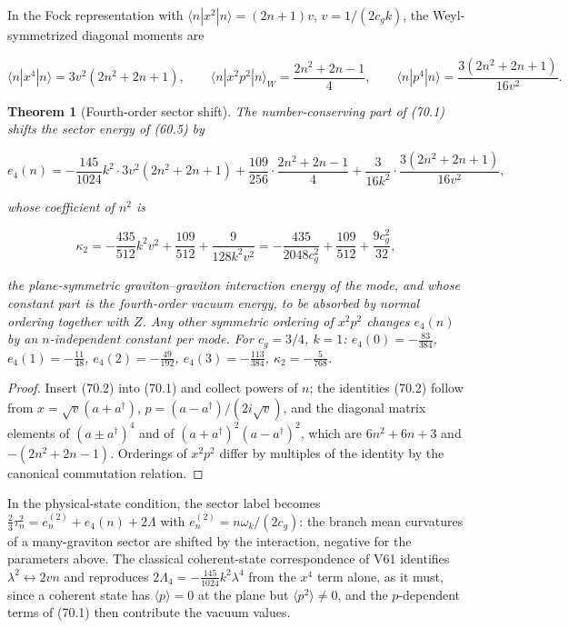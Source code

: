 \documentclass[11pt]{article}
\newtheorem{theorem}{Theorem}[section]
\theoremstyle{remark}
\begin{document}
In the Fock representation with \(\langle n|x^2|n\rangle=(2n+1)v\),
\(v=1/(2c_gk)\), the Weyl-symmetrized diagonal moments are

\[
 \langle n|x^4|n\rangle=3v^2(2n^2+2n+1),\qquad
 \langle n|x^2p^2|n\rangle_W=\frac{2n^2+2n-1}4,\qquad
 \langle n|p^4|n\rangle=\frac{3(2n^2+2n+1)}{16v^2}.                   \tag{70.2}
\]

\begin{theorem}[Fourth-order sector shift]
\label{thm:v19v67-shift}
The number-conserving part of (70.1) shifts the sector energy of
(60.5) by

\[
 e_4(n)=-\frac{145}{1024}k^2\cdot3v^2(2n^2+2n+1)
 +\frac{109}{256}\cdot\frac{2n^2+2n-1}4
 +\frac3{16k^2}\cdot\frac{3(2n^2+2n+1)}{16v^2},                        \tag{70.3}
\]

whose coefficient of \(n^2\) is

\[
 \kappa_2=-\frac{435}{512}k^2v^2+\frac{109}{512}+\frac{9}{128k^2v^2}
 =-\frac{435}{2048c_g^2}+\frac{109}{512}+\frac{9c_g^2}{32},             \tag{70.4}
\]

the plane-symmetric graviton--graviton interaction energy of the mode,
and whose constant part is the fourth-order vacuum energy, to be
absorbed by normal ordering together with \(Z\).  Any other symmetric
ordering of \(x^2p^2\) changes \(e_4(n)\) by an \(n\)-independent
constant per mode.  For \(c_g=3/4\), \(k=1\):
\(e_4(0)=-\tfrac{83}{384}\), \(e_4(1)=-\tfrac{11}{48}\),
\(e_4(2)=-\tfrac{49}{192}\), \(e_4(3)=-\tfrac{113}{384}\),
\(\kappa_2=-\tfrac5{768}\).
\end{theorem}

\begin{proof}
Insert (70.2) into (70.1) and collect powers of \(n\); the
identities (70.2) follow from \(x=\sqrt v(a+a^\dagger)\),
\(p=(a-a^\dagger)/(2i\sqrt v)\), and the diagonal matrix elements of
\((a\pm a^\dagger)^4\) and of \((a+a^\dagger)^2(a-a^\dagger)^2\), which are
\(6n^2+6n+3\) and \(-(2n^2+2n-1)\).  Orderings of \(x^2p^2\) differ by
multiples of the identity by the canonical commutation relation.
\end{proof}

In the physical-state condition, the sector label becomes
\(\tfrac23\tau_n^2=e_n^{(2)}+e_4(n)+2\Lambda\) with
\(e_n^{(2)}=n\omega_k/(2c_g)\): the branch mean curvatures of a
many-graviton sector are shifted by the interaction, negative for the
parameters above.  The classical coherent-state correspondence of
V61 identifies \(\lambda^2\leftrightarrow2vn\) and reproduces
\(2\Lambda_4=-\tfrac{145}{1024}k^2\lambda^4\) from the \(x^4\) term
alone, as it must, since a coherent state has \(\langle p\rangle=0\) at
the plane but \(\langle p^2\rangle\neq0\), and the \(p\)-dependent terms
of (70.1) then contribute the vacuum values.
\end{document}
